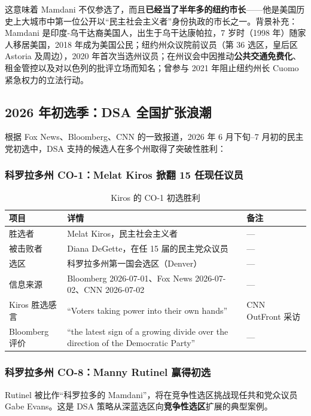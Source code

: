 \documentclass[12pt,a4paper]{ctexart}
\begin{document}
这意味着 Mamdani 不仅参选了，而且\textbf{已经当了半年多的纽约市长}——他是美国历史上大城市中第一位公开以``民主社会主义者''身份执政的市长之一。背景补充：Mamdani 是印度-乌干达裔美国人，出生于乌干达康帕拉，7 岁时（1998 年）随家人移居美国，2018 年成为美国公民；纽约州众议院前议员（第 36 选区，皇后区 Astoria 及周边），2020 年首次当选州议员；在州议会中因推动\textbf{公共交通免费化}、租金管控以及对以色列的批评立场而知名；曾参与 2021 年阻止纽约州长 Cuomo 紧急权力的立法行动。

\subsection{2026 年初选季：DSA 全国扩张浪潮}

根据 Fox News、Bloomberg、CNN 的一致报道，2026 年 6 月下旬--7 月初的民主党初选中，DSA 支持的候选人在多个州取得了突破性胜利：

\subsubsection{科罗拉多州 CO-1：Melat Kiros 掀翻 15 任现任议员}

\begin{table}[h]
\centering
\caption{Kiros 的 CO-1 初选胜利}
\begin{tabular}{@{}lp{4.2cm}p{8.2cm}@{}}
\toprule
\textbf{项目} & \textbf{详情} & \textbf{备注} \\
\midrule
胜选者 & Melat Kiros，民主社会主义者 & --- \\
被击败者 & Diana DeGette，在任 15 届的民主党众议员 & --- \\
选区 & 科罗拉多州第一国会选区（Denver） & --- \\
信息来源 & Bloomberg 2026-07-01、Fox News 2026-07-02、CNN 2026-07-02 & --- \\
Kiros 胜选感言 & ``Voters taking power into their own hands'' & CNN OutFront 采访 \\
Bloomberg 评价 & ``the latest sign of a growing divide over the direction of the Democratic Party'' & --- \\
\bottomrule
\end{tabular}
\end{table}

\subsubsection{科罗拉多州 CO-8：Manny Rutinel 赢得初选}

Rutinel 被比作``科罗拉多的 Mamdani''，将在竞争性选区挑战现任共和党众议员 Gabe Evans。这是 DSA 策略从深蓝选区向\textbf{竞争性选区}扩展的典型案例。
\end{document}
